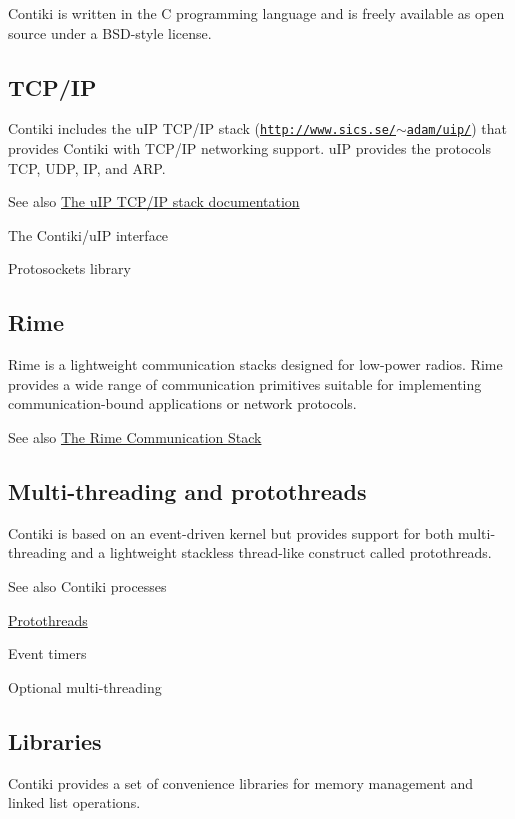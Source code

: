 \-Contiki is written in the \-C programming language and is freely available as open source under a \-B\-S\-D-\/style license.\hypertarget{index_contiki-mainpage-tcpip}{}\subsection{\-T\-C\-P/\-I\-P}\label{index_contiki-mainpage-tcpip}
\-Contiki includes the u\-I\-P \-T\-C\-P/\-I\-P stack (\href{http://www.sics.se/~adam/uip/}{\tt http\-://www.\-sics.\-se/$\sim$adam/uip/}) that provides \-Contiki with \-T\-C\-P/\-I\-P networking support. u\-I\-P provides the protocols \-T\-C\-P, \-U\-D\-P, \-I\-P, and \-A\-R\-P.

\begin{DoxySeeAlso}{\-See also}
\hyperlink{a00060}{\-The u\-I\-P \-T\-C\-P/\-I\-P stack documentation} 

\-The \-Contiki/u\-I\-P interface 

\-Protosockets library
\end{DoxySeeAlso}
\hypertarget{index_contiki-mainpage-rime}{}\subsection{\-Rime}\label{index_contiki-mainpage-rime}
\-Rime is a lightweight communication stacks designed for low-\/power radios. \-Rime provides a wide range of communication primitives suitable for implementing communication-\/bound applications or network protocols.

\begin{DoxySeeAlso}{\-See also}
\hyperlink{a00054}{\-The \-Rime \-Communication \-Stack}
\end{DoxySeeAlso}
\hypertarget{index_contiki-mainpage-threads}{}\subsection{\-Multi-\/threading and protothreads}\label{index_contiki-mainpage-threads}
\-Contiki is based on an event-\/driven kernel but provides support for both multi-\/threading and a lightweight stackless thread-\/like construct called protothreads.

\begin{DoxySeeAlso}{\-See also}
\-Contiki processes 

\hyperlink{a00052}{\-Protothreads} 

\-Event timers 

\-Optional multi-\/threading
\end{DoxySeeAlso}
\hypertarget{index_contiki-mainpage-lib}{}\subsection{\-Libraries}\label{index_contiki-mainpage-lib}
\-Contiki provides a set of convenience libraries for memory management and linked list operations.


